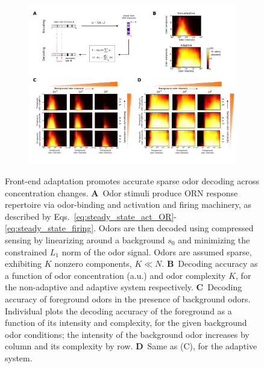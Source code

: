 \begin{figure}[!tb]
	\centering
	\begin{subfigure}[t]{\linewidth}
		\includegraphics[width=\textwidth]{figures/3_decoding_discimination}
		\label{fig:decoding_a}
	\end{subfigure}
	\begin{subfigure}[t]{0\linewidth}
		\label{fig:decoding_b}
	\end{subfigure}
	\begin{subfigure}[t]{0\linewidth}
		\label{fig:decoding_c}
	\end{subfigure}
	\begin{subfigure}[t]{0\linewidth}
		\label{fig:decoding_d}
	\end{subfigure}
	\caption{\footnotesize{Front-end adaptation promotes accurate sparse odor decoding across concentration changes. 
    \textbf{A}~Odor stimuli produce ORN response repertoire via odor-binding and activation and firing machinery, as described by Eqs.~\ref{eq:steady_state_act_OR}-\ref{eq:steady_state_firing}. Odors are then decoded using compressed sensing by linearizing around a background $s_0$ and minimizing the constrained $L_1$ norm of the odor signal.  Odors are assumed sparse, exhibiting $K$ nonzero components, $K \ll N$. 
    \textbf{B}~Decoding accuracy as a function of odor concentration (a.u.) and odor complexity $K$, for the non-adaptive and adaptive system respectively. 
    \textbf{C}~Decoding accuracy of foreground odors in the presence of background odors. Individual plots the decoding accuracy of the foreground as a function of its intensity and complexity, for the given background odor conditions; the intensity of the background odor increases by column and its complexity by row.
    \textbf{D}~Same as (C), for the adaptive system.}}
	\label{fig:decoding}
\end{figure}


